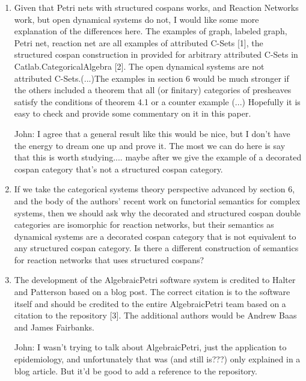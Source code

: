 \documentclass[reqno]{amsart}
\def\john{\color{red} John: }
\begin{document}
\begin{enumerate}
{\john In fact our goal, as explained in the abstract and introduction, is to prove that the structured and decorated cospan approaches are equivalent under certain conditions, and to illustrate this result with a wide variety of examples.}

\item Given that Petri nets with structured cospans works, and Reaction Networks work, but open dynamical systems do not, I would like some more 
explanation of the differences here. The examples of graph, labeled 
graph, Petri net, reaction net are all examples of attributed C-Sets [1], the structured cospan construction in provided for arbitrary attributed 
C-Sets in Catlab.CategoricalAlgebra [2]. The open dynamical systems are not attributed C-Sets.(...)The examples in section 6 would be much stronger 
if the others included a theorem that all (or finitary) categories of presheaves satisfy the 
conditions of theorem 4.1 or a counter example (...) Hopefully it is easy to check and provide some 
commentary 
on it in this paper.

{\john I agree that a general result like this would be nice, but I don't have the energy to dream one up and prove it. The most we can do here is say 
that this is worth studying.... maybe after we give the example of a decorated cospan category that's not a structured cospan category.}

\item If we take the categorical systems theory perspective advanced by section 6, and the body of the authors’ recent work on functorial semantics 
for complex 
systems, then we should ask why the decorated and structured cospan double categories are isomorphic for reaction networks, but their semantics as 
dynamical systems are a decorated cospan category that is not equivalent to any structured cospan category. Is there a different construction of 
semantics for reaction networks that uses structured cospans?

\item The development of the AlgebraicPetri software system is credited to Halter and Patterson based on a blog post. The correct citation is to the 
software itself and should be credited to the entire AlgebraicPetri team based on a citation to the repository [3]. The additional authors would be 
Andrew Baas and James Fairbanks.

{\john I wasn't trying to talk about AlgebraicPetri, just the application to epidemiology, and unfortunately that was (and still is???) only explained 
in a blog article. But it'd be good to add a reference to the repository.}


\end{enumerate}
\end{document}
